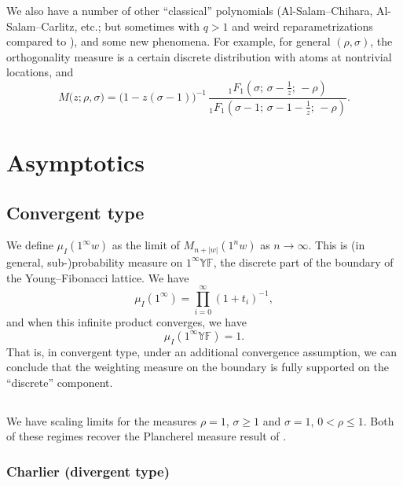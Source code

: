 \documentclass[letterpaper,11pt,oneside,reqno]{article}
\numberwithin{equation}{section}
\theoremstyle{definition}
\begin{document}
We also have a number of other ``classical'' polynomials
(Al-Salam--Chihara, Al-Salam--Carlitz, etc.; but sometimes with $q>1$ and
weird reparametrizations compared to \cite{Koekoek1996}),
and some new phenomena. For example, for general $(\rho,\sigma)$,
the orthogonality measure is
a certain discrete distribution with atoms at nontrivial locations, and
\begin{equation}
	\label{eq:MGF_shifted_charlier_solution}
	M\big(z;\rho, \sigma\big)
	=
	\big(1 - z(\sigma-1) \big)^{-1} \,
        \frac{
		{_1F_1}\left(\sigma  ; \, \sigma - \frac{1}{z}  ; \, -\rho \right)
		}{
		{_1F_1}\left(\sigma - 1 ; \, \sigma -1 - \frac{1}{z}  ; \, -\rho \right)}.
\end{equation}


\section{Asymptotics}

\subsection{Convergent type}

We define $\mu_I(1^\infty w)$ as the limit of
$M_{n+|w|}(1^n w)$ as $n\to\infty$.
This is (in general, sub-)probability measure on $1^\infty\mathbb{YF}$, the
discrete part of the boundary of the Young--Fibonacci lattice.
We have
\begin{equation*}
	\mu_I(1^\infty)=\prod_{i=0}^{\infty}(1+t_i)^{-1},
\end{equation*}
and when this infinite product converges, we have
\begin{equation*}
	\mu_I(1^\infty \mathbb{YF})=1.
\end{equation*}
That is, in convergent type, under an
additional convergence assumption,
we can conclude that the weighting measure
on the boundary is fully supported on the
``discrete'' component.

\subsection{}

We have scaling limits for the measures
$\rho=1$, $\sigma\ge1$
and
$\sigma=1$, $0<\rho\le 1$.
Both of these regimes recover the Plancherel measure
result of \cite{gnedin2000plancherel}.

\subsubsection{Charlier (divergent type)}
\end{document}
